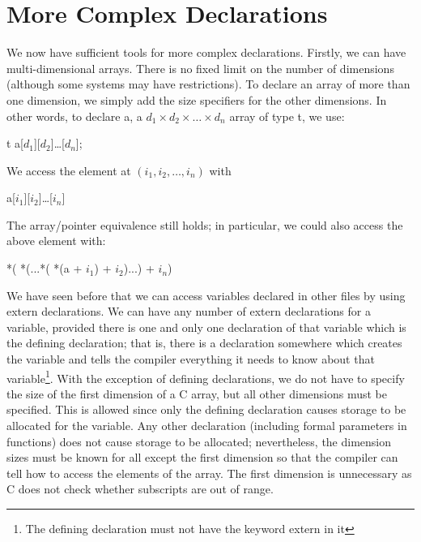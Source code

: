 \section{More Complex Declarations}
\label{complxDecl}
     We now  have sufficient  tools for more complex declarations.
Firstly, we can have  {\kc multi-dimensional arrays}.  There is  no
fixed limit on the number of dimensions (although  some systems may
have restrictions). To declare an array of more  than one  dimension,
we  simply add the size specifiers for the other dimensions. In other
words, to declare {\cd a}, a $d_{1} \times  d_{2}
\times \ldots \times  d_{n}$ array of type {\cd t}, we use:
\begin{code}
t  a[$d_{1}$][$d_{2}$]\ldots[$d_{n}$];
\end{code}
\noindent
     We access the element at $(i_{1}, i_{2}, \ldots, i_{n})$ with
\begin{code}
a[$i_{1}$][$i_{2}$]\ldots[$i_{n}$]
\end{code}
\noindent
     The array/pointer  equivalence still  holds; in particular, we
could also access the above element with:
\begin{code}
*( *(...*( *(a + $i_{1}$) + $i_{2}$)...) + $i_{n}$)
\end{code}
\noindent
     We have  seen before  that we  can access  variables declared in
other files by using {\cd extern} declarations. 
We can have any
number of {\cd extern} declarations for a variable, provided  there
is  one and only one declaration  of that  variable which  is the
{\kc defining declaration}; that is, there is a declaration
somewhere which creates the variable  and tells the  compiler
everything it needs  to  know about  that variable\footnote{The
defining declaration must not have the keyword {\cd extern} in it}. 
With  the exception of  defining declarations, we do not have to
specify the size of the first  dimension  of  a  C array, but all 
other dimensions  must  be specified.  This is  allowed since only
the defining declaration  causes storage to be allocated for the
variable.  Any other  declaration (including formal parameters in
functions) does not cause storage to be allocated; nevertheless,  the
dimension sizes must be known for all except the first dimension  so
that  the compiler  can tell how to access the elements of the
array.  The first  dimension is  unnecessary as  C does  not check
whether subscripts are out of range.
				  

